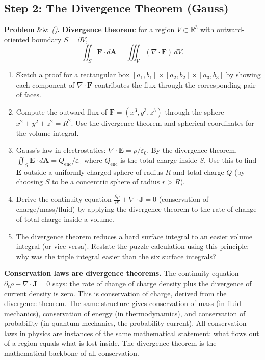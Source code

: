 \documentclass[12pt,a4paper]{article}
\newcounter{problem}
\newenvironment{problem}[1][]{\refstepcounter{problem}\par\vspace{6pt}\noindent\textbf{\color{MidBlue}Problem \theproblem}\ifx&#1&\else\ \textit{(#1)}\fi\textbf{.}\enskip}{\par\vspace{4pt}}
\begin{document}
\subsection{Step 2: The Divergence Theorem (Gauss)}

\begin{problem}
\label{prob:gauss}
\textbf{Divergence theorem}: for a region $V\subset\mathbb{R}^3$ with outward-oriented boundary $S=\partial V$,
\[
  \iint_S\mathbf{F}\cdot d\mathbf{A} = \iiint_V(\nabla\cdot\mathbf{F})\,dV.
\]
\begin{enumerate}[label=(\alph*),topsep=2pt]
  \item Sketch a proof for a rectangular box $[a_1,b_1]\times[a_2,b_2]\times[a_3,b_3]$ by showing each component of $\nabla\cdot\mathbf{F}$ contributes the flux through the corresponding pair of faces.
  \item Compute the outward flux of $\mathbf{F}=(x^3,y^3,z^3)$ through the sphere $x^2+y^2+z^2=R^2$. Use the divergence theorem and spherical coordinates for the volume integral.
  \item Gauss's law in electrostatics: $\nabla\cdot\mathbf{E} = \rho/\varepsilon_0$. By the divergence theorem, $\iint_S\mathbf{E}\cdot d\mathbf{A} = Q_{\text{enc}}/\varepsilon_0$ where $Q_{\text{enc}}$ is the total charge inside $S$. Use this to find $\mathbf{E}$ outside a uniformly charged sphere of radius $R$ and total charge $Q$ (by choosing $S$ to be a concentric sphere of radius $r>R$).
  \item Derive the continuity equation $\frac{\partial\rho}{\partial t}+\nabla\cdot\mathbf{J}=0$ (conservation of charge/mass/fluid) by applying the divergence theorem to the rate of change of total charge inside a volume.
  \item The divergence theorem reduces a hard surface integral to an easier volume integral (or vice versa). Restate the puzzle calculation using this principle: why was the triple integral easier than the six surface integrals?
\end{enumerate}
\end{problem}

\begin{thought}
\textbf{Conservation laws are divergence theorems.}
The continuity equation $\partial_t\rho + \nabla\cdot\mathbf{J}=0$ says: the rate of change of charge density plus the divergence of current density is zero. This is conservation of charge, derived from the divergence theorem. The same structure gives conservation of mass (in fluid mechanics), conservation of energy (in thermodynamics), and conservation of probability (in quantum mechanics, the probability current). All conservation laws in physics are instances of the same mathematical statement: what flows out of a region equals what is lost inside. The divergence theorem is the mathematical backbone of all conservation.
\end{thought}
\end{document}
